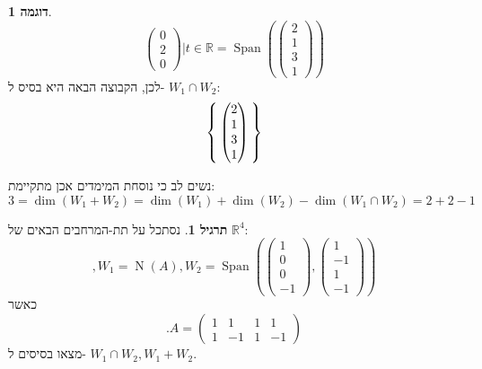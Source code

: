 \documentclass[12pt]{report}
\theoremstyle{plain}
\theoremstyle{definition}
\newtheorem{example}{דוגמה}[chapter]
\newtheorem{exercise}{תרגיל}[chapter]
\newcommand{\R}{\mathbb{R}}
\newcommand{\0}{\mathbf{0}}
\DeclareMathOperator{\Span}{Span}
\DeclareMathOperator{\Null}{N}
\begin{document}
\begin{example}
$${\begin{pmatrix}
0 \\
2 \\
0   
\end{pmatrix}|t\in\R}=\Span\left(\begin{pmatrix}
2 \\
1 \\
3 \\
1   
\end{pmatrix}\right)
$$
לכן, הקבוצה הבאה היא בסיס ל-
$W_1\cap W_2$:
$$
\Set{\begin{pmatrix}
2 \\
1 \\
3 \\
1   
\end{pmatrix}}
$$

נשים לב כי נוסחת המימדים אכן מתקיימת:
$$
3=\dim(W_1+W_2)=\dim(W_1)+\dim(W_2)-\dim(W_1\cap W_2)=2+2-1
$$

\end{example}

\begin{exercise}
נסתכל על תת-המרחבים הבאים של
$\R^4$:
$$
,W_1=\Null(A), W_2=\Span\left(\begin{pmatrix}1\\0\\0\\-1\end{pmatrix},\begin{pmatrix}1\\-1\\1\\-1\end{pmatrix}\right)
$$
כאשר
$$
.A=\begin{pmatrix}
1 & 1 & 1 & 1 \\
1 & -1 & 1 & -1
\end{pmatrix}
$$
מצאו בסיסים ל-
$W_1\cap W_2,W_1+W_2$.

\end{exercise}
\end{document}

